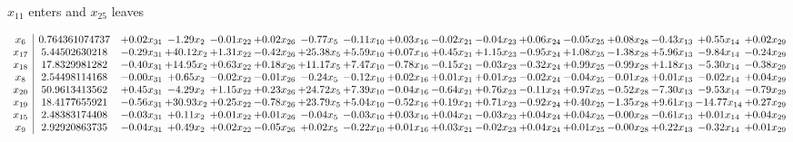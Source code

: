 \documentclass[9pt]{article}
\begin{document}
 $ x_{11} $ enters and $ x_{25} $ leaves 

 \[\begin{array}{c| c c@{\hskip 2pt} c@{\hskip 2pt} c@{\hskip 2pt} c@{\hskip 2pt} c@{\hskip 2pt} c@{\hskip 2pt} c@{\hskip 2pt} c@{\hskip 2pt} c@{\hskip 2pt} c@{\hskip 2pt} c@{\hskip 2pt} c@{\hskip 2pt} c@{\hskip 2pt} c@{\hskip 2pt} c@{\hskip 2pt} }
 x_{6}   &  0.764361074737 & +  0.02 x_{31} & -1.29 x_{2} & -0.01 x_{22} & +  0.02 x_{26} & -0.77 x_{5} & -0.11 x_{10} & +  0.03 x_{16} & -0.02 x_{21} & -0.04 x_{23} & +  0.06 x_{24} & -0.05 x_{25} & +  0.08 x_{28} & -0.43 x_{13} & +  0.55 x_{14} & +  0.02 x_{29}\\
 x_{17}   &  5.44502630218 & -0.29 x_{31} & + 40.12 x_{2} & +  1.31 x_{22} & -0.42 x_{26} & + 25.38 x_{5} & +  5.59 x_{10} & +  0.07 x_{16} & +  0.45 x_{21} & +  1.15 x_{23} & -0.95 x_{24} & +  1.08 x_{25} & -1.38 x_{28} & +  5.96 x_{13} & -9.84 x_{14} & -0.24 x_{29}\\
 x_{18}   &  17.8329981282 & -0.40 x_{31} & + 14.95 x_{2} & +  0.63 x_{22} & +  0.18 x_{26} & + 11.17 x_{5} & +  7.47 x_{10} & -0.78 x_{16} & -0.15 x_{21} & -0.03 x_{23} & -0.32 x_{24} & +  0.99 x_{25} & -0.99 x_{28} & +  1.18 x_{13} & -5.30 x_{14} & -0.38 x_{29}\\
 x_{8}   &  2.54498114168 & -0.00 x_{31} & +  0.65 x_{2} & -0.02 x_{22} & -0.01 x_{26} & -0.24 x_{5} & -0.12 x_{10} & +  0.02 x_{16} & +  0.01 x_{21} & +  0.01 x_{23} & -0.02 x_{24} & -0.04 x_{25} & -0.01 x_{28} & +  0.01 x_{13} & -0.02 x_{14} & +  0.04 x_{29}\\
 x_{20}   &  50.9613413562 & +  0.45 x_{31} & -4.29 x_{2} & +  1.15 x_{22} & +  0.23 x_{26} & + 24.72 x_{5} & +  7.39 x_{10} & -0.04 x_{16} & -0.64 x_{21} & +  0.76 x_{23} & -0.11 x_{24} & +  0.97 x_{25} & -0.52 x_{28} & -7.30 x_{13} & -9.53 x_{14} & -0.79 x_{29}\\
 x_{19}   &  18.4177655921 & -0.56 x_{31} & + 30.93 x_{2} & +  0.25 x_{22} & -0.78 x_{26} & + 23.79 x_{5} & +  5.04 x_{10} & -0.52 x_{16} & +  0.19 x_{21} & +  0.71 x_{23} & -0.92 x_{24} & +  0.40 x_{25} & -1.35 x_{28} & +  9.61 x_{13} & -14.77 x_{14} & +  0.27 x_{29}\\
 x_{15}   &  2.48383174408 & -0.03 x_{31} & +  0.11 x_{2} & +  0.01 x_{22} & +  0.01 x_{26} & -0.04 x_{5} & -0.03 x_{10} & +  0.03 x_{16} & +  0.04 x_{21} & -0.03 x_{23} & +  0.04 x_{24} & +  0.04 x_{25} & -0.00 x_{28} & -0.61 x_{13} & +  0.01 x_{14} & +  0.04 x_{29}\\
 x_{9}   &  2.92920863735 & -0.04 x_{31} & +  0.49 x_{2} & +  0.02 x_{22} & -0.05 x_{26} & +  0.02 x_{5} & -0.22 x_{10} & +  0.01 x_{16} & +  0.03 x_{21} & -0.02 x_{23} & +  0.04 x_{24} & +  0.01 x_{25} & -0.00 x_{28} & +  0.22 x_{13} & -0.32 x_{14} & +  0.01 x_{29}\\

\end{array}\]
\end{document}
